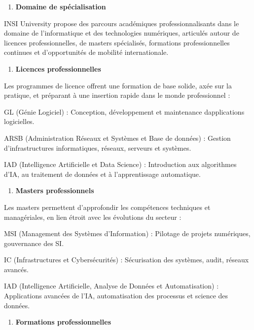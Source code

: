 \begin{enumerate}
	\def\labelenumi{\arabic{enumi}.}
	\setcounter{enumi}{1}
	\item
	\textbf{Domaine de spécialisation}
\end{enumerate}

INSI University propose des parcours académiques
	professionnalisants dans le domaine de l'informatique et des
technologies numériques, articulés autour de licences professionnelles,
de masters spécialisés, formations professionnelles continues et
d'opportunités de mobilité internationale.

\begin{enumerate}
	\def\labelenumi{\alph{enumi})}
	\item
	\textbf{Licences professionnelles}
\end{enumerate}

Les programmes de licence offrent une formation de base solide, axée sur
la pratique, et préparant à une insertion rapide dans le monde
professionnel :

GL (Génie Logiciel) : Conception, développement et maintenance
d\textquotesingle applications logicielles.

ARSB (Administration Réseaux et Systèmes et Base de données) :
Gestion d'infrastructures informatiques, réseaux, serveurs et systèmes.

IAD (Intelligence Artificielle et Data Science) : Introduction
aux algorithmes d'IA, au traitement de données et à l'apprentissage
automatique.

\begin{enumerate}
	\def\labelenumi{\alph{enumi})}
	\setcounter{enumi}{1}
	\item
	\textbf{Masters professionnels}
\end{enumerate}

Les masters permettent d'approfondir les compétences techniques et
managériales, en lien étroit avec les évolutions du secteur :

MSI (Management des Systèmes d'Information) : Pilotage de
projets numériques, gouvernance des SI.

IC (Infrastructures et Cybersécurités) : Sécurisation des
systèmes, audit, réseaux avancés.

IAD (Intelligence Artificielle, Analyse de Données et
	Automatisation) : Applications avancées de l'IA, automatisation des
processus et science des données.

\begin{enumerate}
	\def\labelenumi{\alph{enumi})}
	\setcounter{enumi}{2}
	\item
	\textbf{Formations professionnelles}
\end{enumerate}

